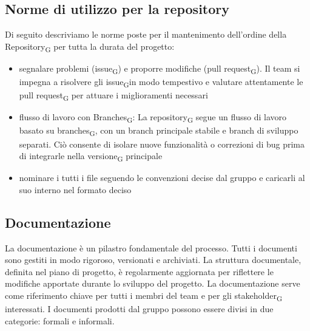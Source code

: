 \documentclass{article}
\begin{document}
\subsection{Norme di utilizzo per la repository}
Di seguito descriviamo le norme poste per il mantenimento dell'ordine della Repository\textsubscript{G} per tutta la durata del progetto:
\begin{itemize}
    \item segnalare problemi (issue\textsubscript{G}) e proporre modifiche (pull request\textsubscript{G}). Il team si impegna a risolvere gli issue\textsubscript{G}in modo tempestivo e valutare attentamente le pull request\textsubscript{G} per attuare i miglioramenti necessari
    \item flusso di lavoro con Branches\textsubscript{G}: La repository\textsubscript{G} segue un flusso di lavoro basato su branches\textsubscript{G}, con un branch principale stabile e branch di sviluppo separati. Ciò consente di isolare nuove funzionalità o correzioni di bug prima di integrarle nella versione\textsubscript{G} principale
    \item nominare i tutti i file seguendo le convenzioni decise dal gruppo e caricarli al suo interno nel formato deciso
\end{itemize}



\subsection{Documentazione}
La documentazione è un pilastro fondamentale del processo. Tutti i documenti sono gestiti in modo rigoroso, versionati e archiviati. La struttura documentale, definita nel piano di progetto, è regolarmente aggiornata per riflettere le modifiche apportate durante lo sviluppo del progetto. La documentazione serve come riferimento chiave per tutti i membri del team e per gli stakeholder\textsubscript{G} interessati. I documenti prodotti dal gruppo possono essere divisi in due categorie: formali e informali.
\end{document}
